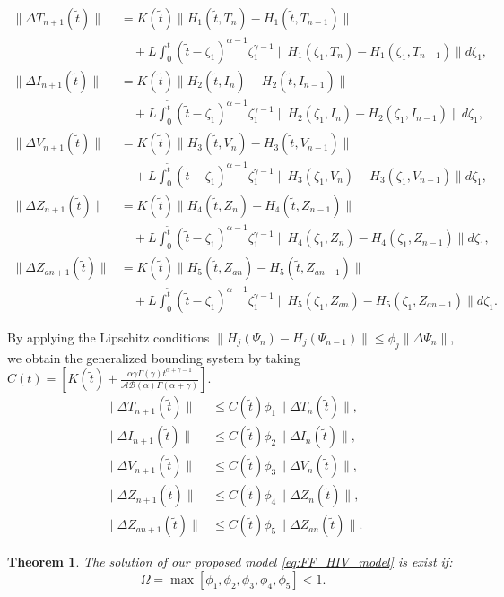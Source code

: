 \documentclass{article}
\theoremstyle{plain}
\newtheorem{theorem}{Theorem}[section]
\theoremstyle{definition}
\numberwithin{equation}{section}
\begin{document}
\begin{align*}
	\|\Delta T_{n+1}(\tilde{t})\| &= K(\tilde{t}) \|H_1(\tilde{t}, T_n) - H_1(\tilde{t}, T_{n-1})\| \\
	&\quad + L \int_0^{\tilde{t}} (\tilde{t}-\zeta_1)^{\alpha-1} \zeta_1^{\gamma-1} \|H_1(\zeta_1, T_n) - H_1(\zeta_1, T_{n-1})\| d\zeta_1, \\[10pt]
	\|\Delta I_{n+1}(\tilde{t})\| &= K(\tilde{t}) \|H_2(\tilde{t}, I_n) - H_2(\tilde{t}, I_{n-1})\| \\
	&\quad + L \int_0^{\tilde{t}} (\tilde{t}-\zeta_1)^{\alpha-1} \zeta_1^{\gamma-1} \|H_2(\zeta_1, I_n) - H_2(\zeta_1, I_{n-1})\| d\zeta_1, \\[10pt]
	\|\Delta V_{n+1}(\tilde{t})\| &= K(\tilde{t}) \|H_3(\tilde{t}, V_n) - H_3(\tilde{t}, V_{n-1})\| \\
	&\quad + L \int_0^{\tilde{t}} (\tilde{t}-\zeta_1)^{\alpha-1} \zeta_1^{\gamma-1} \|H_3(\zeta_1, V_n) - H_3(\zeta_1, V_{n-1})\| d\zeta_1, \\[10pt]
	\|\Delta Z_{n+1}(\tilde{t})\| &= K(\tilde{t}) \|H_4(\tilde{t}, Z_n) - H_4(\tilde{t}, Z_{n-1})\| \\
	&\quad + L \int_0^{\tilde{t}} (\tilde{t}-\zeta_1)^{\alpha-1} \zeta_1^{\gamma-1} \|H_4(\zeta_1, Z_n) - H_4(\zeta_1, Z_{n-1})\| d\zeta_1, \\[10pt]
	\|\Delta Z_{an+1}(\tilde{t})\| &= K(\tilde{t}) \|H_5(\tilde{t}, Z_{an}) - H_5(\tilde{t}, Z_{an-1})\| \\
	&\quad + L \int_0^{\tilde{t}} (\tilde{t}-\zeta_1)^{\alpha-1} \zeta_1^{\gamma-1} \|H_5(\zeta_1, Z_{an}) - H_5(\zeta_1, Z_{an-1})\| d\zeta_1.
\end{align*}

By applying the Lipschitz conditions $\|H_j(\Psi_n) - H_j(\Psi_{n-1})\| \leq \phi_j \|\Delta \Psi_n\|$, we obtain the generalized bounding system by taking $C(t) =\left[ K(\tilde{t}) + \frac{\alpha\gamma \Gamma(\gamma) t^{\alpha+\gamma-1}}{\mathcal{AB(\alpha)}\Gamma(\alpha+\gamma)} \right] $.
\begin{align*}
	\|\Delta T_{n+1}(\tilde{t})\| &\leq C(\tilde{t}) \phi_1 \|\Delta T_n(\tilde{t})\|, \\[10pt]
	\|\Delta I_{n+1}(\tilde{t})\| &\leq C(\tilde{t}) \phi_2 \|\Delta I_n(\tilde{t})\|, \\[10pt]
	\|\Delta V_{n+1}(\tilde{t})\| &\leq C(\tilde{t}) \phi_3 \|\Delta V_n(\tilde{t})\|, \\[10pt]
	\|\Delta Z_{n+1}(\tilde{t})\| &\leq C(\tilde{t}) \phi_4 \|\Delta Z_n(\tilde{t})\|, \\[10pt]
	\|\Delta Z_{an+1}(\tilde{t})\| &\leq C(\tilde{t}) \phi_5 \|\Delta Z_{an}(\tilde{t})\|.
\end{align*}
\begin{theorem}
	The solution of our proposed model \eqref{eq:FF_HIV_model} is exist if:
	\begin{equation}
		\Omega = \max[\phi_1, \phi_2, \phi_3, \phi_4, \phi_5] < 1.
	\end{equation}
\end{theorem}
\end{document}
